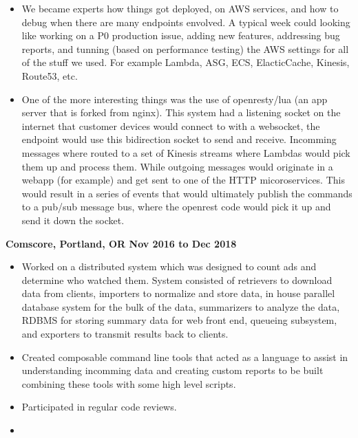 \documentclass{res}
\begin{document}
\begin{resume}
\begin{itemize}
Other teams did things in Lua and Go. Which we eventually owned due to
the creators quiting.

  \item
We became experts how things got deployed, on AWS services, and how to
debug when there are many endpoints envolved.  A typical week could
looking like working on a P0 production issue, adding new features,
addressing bug reports, and tunning (based on performance testing) the
AWS settings for all of the stuff we used.  For example Lambda, ASG,
ECS, ElacticCache, Kinesis, Route53, etc.

  \item
One of the more interesting things was the use of openresty/lua (an app server
that is forked from nginx).  This system had a listening socket on the
internet that customer devices would connect to with a websocket, the endpoint
would use this bidirection socket to send and receive.  Incomming messages
where routed to a set of Kinesis streams where Lambdas would pick them up and
process them.  While outgoing messages would originate in a webapp (for
example) and get sent to one of  the HTTP micoroservices.  This would result
in a series of events that would ultimately publish the commands to a pub/sub
message bus, where the openrest code would pick it up and send it down the socket.
  \end{itemize}

  {\large \bf Comscore, Portland, OR \hfill Nov 2016 to Dec 2018}
  \begin{itemize}

  \item
    Worked on a distributed system which was designed to count ads and
    determine who watched them.  System consisted of retrievers to download
    data from clients, importers to normalize and store data, in house
    parallel database system for the bulk of the data, summarizers to
    analyze the data, RDBMS for storing summary data for
    web front end, queueing subsystem, and exporters to transmit
    results back to clients.

  \item
    Created composable command line tools that acted as a language to
    assist in understanding incomming data and creating custom reports to
    be built combining these tools with some high level scripts.

  \item
    Participated in regular code reviews.

  \item


\end{itemize}
\end{resume}
\end{document}
